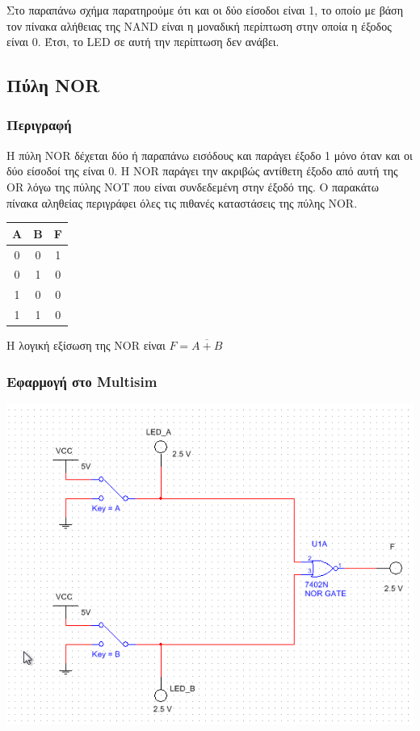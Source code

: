 \documentclass{article}
\begin{document}
Στο παραπάνω σχήμα παρατηρούμε ότι και οι δύο είσοδοι είναι 1, το οποίο με βάση
τον πίνακα αλήθειας της NAND είναι η μοναδική περίπτωση στην οποία η έξοδος είναι 0.
Έτσι, το LED σε αυτή την περίπτωση δεν ανάβει.

\subsection{Πύλη NOR}
\subsubsection{Περιγραφή}

Η πύλη NOR δέχεται δύο ή παραπάνω εισόδους και παράγει έξοδο 1 μόνο όταν και οι δύο
είσοδοί της είναι 0. H NOR παράγει την ακριβώς αντίθετη έξοδο από αυτή της OR λόγω της
πύλης ΝΟΤ που είναι συνδεδεμένη στην έξοδό της. Ο παρακάτω πίνακα αληθείας περιγράφει
όλες τις πιθανές καταστάσεις της πύλης NOR. 

\begin{center}
\begin{tabular}{|c|c|c|}
	\hline
	A & B & F \\
	\hline
	0 & 0 & 1 \\
	0 & 1 & 0 \\
	1 & 0 & 0 \\
	1 & 1 & 0 \\
	\hline
\end{tabular}
\end{center}

Η λογική εξίσωση της NOR είναι $F = \overline{A + B}$

\subsubsection{Εφαρμογή στο Multisim}
\includegraphics[width=\textwidth]{./res/nor.png}
\end{document}
